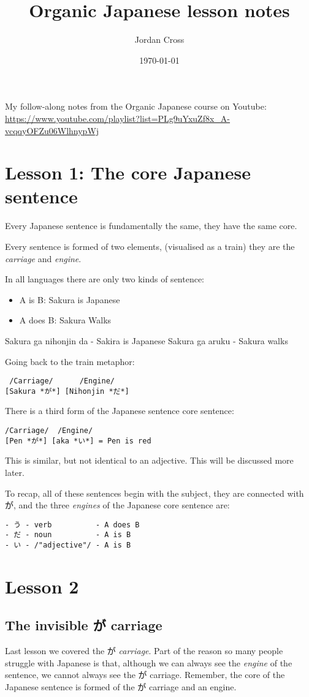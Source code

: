 \documentclass[11pt]{article}
\author{Jordan Cross}
\date{\today}
\title{Organic Japanese lesson notes}
\begin{document}
\maketitle
\tableofcontents

My follow-along notes from the Organic Japanese course on Youtube: \url{https://www.youtube.com/playlist?list=PLg9uYxuZf8x\_A-vcqqyOFZu06WlhnypWj}
\section{Lesson 1: The core Japanese sentence}
\label{sec:org549bba3}
Every Japanese sentence is fundamentally the same, they have the same core.

Every sentence is formed of two elements, (visualised as a train) they are the \emph{carriage} and \emph{engine}.

In all languages there are only two kinds of sentence:
\begin{itemize}
\item A is B: Sakura is Japanese
\item A does B: Sakura Walks
\end{itemize}

Sakura ga nihonjin da - Sakira is Japanese
Sakura ga aruku - Sakura walks

Going back to the train metaphor:
\begin{verbatim}
 /Carriage/      /Engine/
[Sakura *が*] [Nihonjin *だ*]
\end{verbatim}

There is a third form of the Japanese sentence core sentence:
\begin{verbatim}
/Carriage/  /Engine/
[Pen *が*] [aka *い*] = Pen is red
\end{verbatim}

This is similar, but not identical to an adjective. This will be discussed more later.

To recap, all of these sentences begin with the subject, they are connected with が, and the three \emph{engines} of the Japanese core sentence are:
\begin{verbatim}
- う - verb          - A does B
- だ - noun          - A is B
- い - /"adjective"/ - A is B
\end{verbatim}

\section{Lesson 2}
\label{sec:org005a8e1}
\subsection{The invisible が carriage}
\label{sec:orgfe15b06}
Last lesson we covered the が \emph{carriage}. Part of the reason so many people struggle with Japanese is that, although we can always see the \emph{engine} of the sentence, we cannot always see the が carriage. Remember, the core of the Japanese sentence is formed of the が carriage and an engine.
\end{document}
